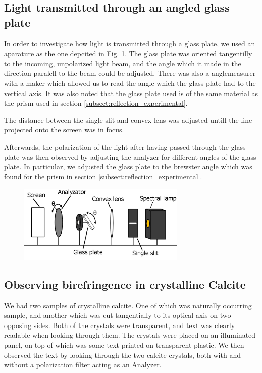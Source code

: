 \documentclass[%
 reprint,
 amsmath,amssymb,
 aps,
]{revtex4-1}
\begin{document}
  \subsection{Light transmitted through an angled glass plate}

    In order to investigate how light is transmitted through a glass plate, we used an aparature as the one depcited in Fig. \ref{fig:glassplate}. The glass plate was oriented tangentilly to the incoming, unpolarized light beam, and the angle which it made in the direction paralell to the beam could be adjusted. There was also a anglemeasurer with a maker which allowed us to read the angle which the glass plate had to the vertical axis. It was also noted that the glass plate used is of the same material as the prism used in section \ref{subsect:reflection_experimental}.

    The distance between the single slit and convex lens was adjusted untill the line projected onto the screen was in focus.

    Afterwards, the polarization of the light after having passed through the glass plate was then observed by adjusting the analyzer for different angles of the glass plate. In particular, we adjusted the glass plate to the brewster angle which was found for the prism in section \ref{subsect:reflection_experimental}.

    \begin{figure}[h!]
      \center
      \includegraphics[width=8cm]{scripts/figs/diagram_4.png}
      \caption{}
      \label{fig:glassplate}
    \end{figure}

  \subsection{Observing birefringence in crystalline Calcite}
    We had two samples of crystalline calcite. One of which was naturally occurring sample, and another which was cut tangentially to its optical axis on two opposing sides. Both of the crystals were transparent, and text was clearly readable when looking through them. The crystals were placed on an illuminated panel, on top of which was some text printed on transparent plastic. We then observed the text by looking through the two calcite crystals, both with and without a polarization filter acting as an Analyzer. 
\end{document}
